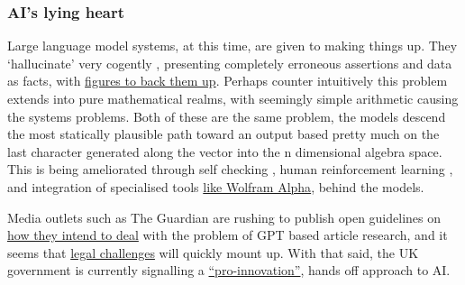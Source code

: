 \subsubsection{AI's lying heart}
Large language model systems, at this time, are given to making things up. They `hallucinate' very cogently \cite{azamfirei2023large}, presenting completely erroneous assertions and data as facts, with \href{https://news.artnet.com/art-world/chatgpt-art-theory-hal-foster-2263711}{figures to back them up}. Perhaps counter intuitively this problem extends into pure mathematical realms, with seemingly simple arithmetic causing the systems problems. Both of these are the same problem, the models descend the most statically plausible path toward an output based pretty much on the last character generated along the vector into the n dimensional algebra space. This is being ameliorated through self checking \cite{manakul2023selfcheckgpt}, human reinforcement learning \cite{ouyang2022training}, and integration of specialised tools \href{https://writings.stephenwolfram.com/2023/01/wolframalpha-as-the-way-to-bring-computational-knowledge-superpowers-to-chatgpt/}{like Wolfram Alpha}, behind the models.\par 
Media outlets such as The Guardian are rushing to publish open guidelines on \href{https://www.theguardian.com/commentisfree/2023/apr/06/ai-chatgpt-guardian-technology-risks-fake-article?}{how they intend to deal} with the problem of GPT based article research, and it seems that \href{https://www.bbc.co.uk/news/technology-65202597}{legal challenges} will quickly mount up. With that said, the UK government is currently signalling a \href{https://www.gov.uk/government/publications/ai-regulation-a-pro-innovation-approach}{``pro-innovation''}, hands off approach to AI.
